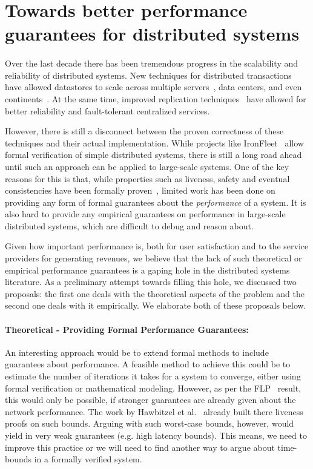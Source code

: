 \section{Towards better performance guarantees for distributed systems}

\paragraph{}
Over the last decade there has been tremendous progress in the scalability and reliability of distributed systems.
New techniques for distributed transactions have allowed datastores to scale across multiple servers~\cite{aguilera2007sinfonia}, data centers, and even continents~\cite{Lloyd:2011:DSE:2043556.2043593}.  At the same time, improved replication techniques~\cite{van2004chain} have allowed for better reliability and fault-tolerant centralized services.

However, there is still a disconnect between the proven correctness of these techniques and their actual implementation. While projects like IronFleet~\cite{hawblitzel2015ironfleet} allow formal verification of simple distributed systems, there is still a long road ahead until such an approach can be applied to large-scale systems.
One of the key reasons for this is that, while properties such as liveness, safety and eventual consistencies have been formally proven~\cite{floyd1967assigning}, limited work has been done on providing any form of formal guarantees about the \emph{performance} of a system. It is also hard to provide any empirical guarantees on performance in large-scale distributed systems, which are difficult to debug and reason about.

Given how important performance is,  both for user satisfaction and to the service providers for generating revenues, we believe that the lack of such theoretical or empirical performance guarantees is a gaping hole in the distributed systems literature. As a preliminary attempt towards filling this hole, we discussed two proposals: the first one deals with the theoretical aspects of the problem and the second one deals with it empirically. We elaborate both of these proposals below.

\paragraph{Theoretical - Providing Formal Performance Guarantees:} An interesting approach would be to extend formal methods to include guarantees about performance. A feasible method to achieve this could be to estimate the number of iterations it takes for a system to converge, either using formal verification or mathematical modeling. However, as per the FLP~\cite{fischer1985impossibility} result, this would only be possible, if stronger guarantees are already given about the network performance. The work by Hawbitzel et al.~\cite{hawblitzel2015ironfleet} already built there liveness proofs on such bounds. Arguing with such worst-case bounds, however, would yield in very weak guarantees (e.g. high latency bounds). This means, we need to improve this practice or we will need to find another way to argue about time-bounds in a formally verified system.


